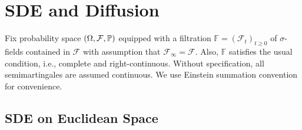 \chapter{SDE and Diffusion}

Fix probability space $(\Omega, \mathcal{F}, \mathbb{P})$ equipped with a filtration $\mathbb{F} = (\mathcal{F}_t)_{t \geq 0}$ of $\sigma$-fields contained in $\mathcal{F}$ with assumption that $\mathcal{F}_\infty = \mathcal{F}$. Also, $\mathbb{F}$ satisfies the usual condition, i.e., complete and right-continuous. Without specification, all semimartingales are assumed continuous. We use Einstein summation convention for convenience.

\section{SDE on Euclidean Space}


